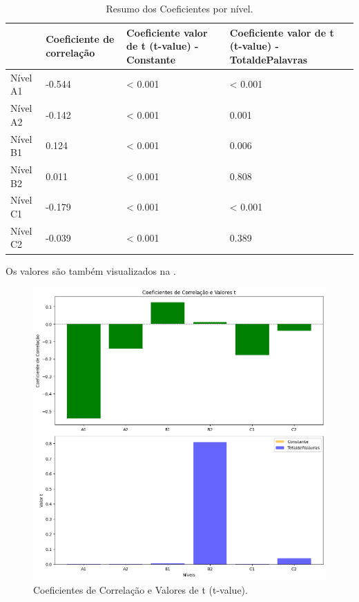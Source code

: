 \documentclass[portuguese]{textolivre}
\begin{document}
\begin{table}[h!]
\centering
\begin{threeparttable}
\caption{Resumo dos Coeficientes por nível.}
\label{tab05}
\begin{tabular}{p{2.0cm} p{3.0cm} p{4.0cm} p{4.0cm}}
\toprule
& Coeficiente de correlação & Coeficiente valor de t (t-value) - Constante & Coeficiente valor de t (t-value) - TotaldePalavras \\
 \midrule
Nível A1 & -0.544 & < 0.001 & < 0.001 \\
Nível A2 & -0.142 & < 0.001 & 0.001 \\
Nível B1 & 0.124 & < 0.001 & 0.006 \\
Nível B2 & 0.011 & < 0.001 & 0.808 \\
Nível C1 & -0.179 & < 0.001 & < 0.001 \\
Nível C2 & -0.039 & < 0.001 & 0.389 \\
\bottomrule
\end{tabular}
\end{threeparttable}
\end{table}

Os valores são também visualizados na .

\begin{figure}[h!]
    \centering
    \includegraphics[width=0.8\linewidth]{Fig9.png}
    \caption{Coeficientes de Correlação e Valores de t (t-value).}
    \label{fig9}
\end{figure}
\end{document}
